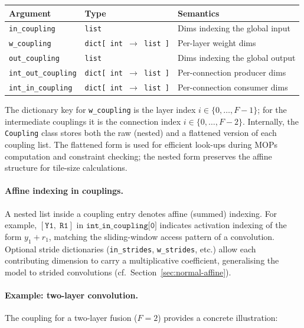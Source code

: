 \begin{center}
\small
\begin{tabular}{lll}
  \toprule
  \textbf{Argument} & \textbf{Type} & \textbf{Semantics} \\
  \midrule
  \texttt{in\_coupling}
      & \texttt{list}
      & Dims indexing the global input \\
  \texttt{w\_coupling}
      & \texttt{dict[\,int $\to$ list\,]}
      & Per-layer weight dims \\
  \texttt{out\_coupling}
      & \texttt{list}
      & Dims indexing the global output \\
  \texttt{int\_out\_coupling}
      & \texttt{dict[\,int $\to$ list\,]}
      & Per-connection producer dims \\
  \texttt{int\_in\_coupling}
      & \texttt{dict[\,int $\to$ list\,]}
      & Per-connection consumer dims \\
  \bottomrule
\end{tabular}
\end{center}

\noindent
The dictionary key for \texttt{w\_coupling} is the layer index
$i \in \{0, \dots, F\!-\!1\}$; for the intermediate couplings it is
the connection index $i \in \{0, \dots, F\!-\!2\}$.
Internally, the \texttt{Coupling} class stores both the raw (nested)
and a flattened version of each coupling list.
The flattened form is used for efficient look-ups during MOPs
computation and constraint checking; the nested form preserves the
affine structure for tile-size calculations.

\paragraph{Affine indexing in couplings.}
A nested list inside a coupling entry denotes affine (summed) indexing.
For example, $[\texttt{Y1},\; \texttt{R1}]$ in
$\texttt{int\_in\_coupling[0]}$ indicates activation indexing of the
form $y_1 + r_1$, matching the sliding-window access pattern of a
convolution.
Optional stride dictionaries (\texttt{in\_strides},
\texttt{w\_strides}, etc.) allow each contributing dimension to carry a
multiplicative coefficient, generalising the model to strided
convolutions (cf.\ Section~\ref{sec:normal-affine}).

\paragraph{Example: two-layer convolution.}
The coupling for a two-layer fusion ($F = 2$) provides a concrete
illustration:

